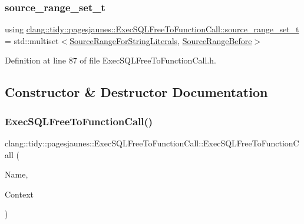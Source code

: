 \subsubsection{\texorpdfstring{source\+\_\+range\+\_\+set\+\_\+t}{source\_range\_set\_t}}
{\footnotesize\ttfamily using \hyperlink{classclang_1_1tidy_1_1pagesjaunes_1_1_exec_s_q_l_free_to_function_call_af0b034c76887939877049fe00944b216}{clang\+::tidy\+::pagesjaunes\+::\+Exec\+S\+Q\+L\+Free\+To\+Function\+Call\+::source\+\_\+range\+\_\+set\+\_\+t} =  std\+::multiset$<$\hyperlink{classclang_1_1tidy_1_1pagesjaunes_1_1_exec_s_q_l_free_to_function_call_1_1_source_range_for_string_literals}{Source\+Range\+For\+String\+Literals}, \hyperlink{classclang_1_1tidy_1_1pagesjaunes_1_1_exec_s_q_l_free_to_function_call_1_1_source_range_before}{Source\+Range\+Before}$>$}



Definition at line 87 of file Exec\+S\+Q\+L\+Free\+To\+Function\+Call.\+h.



\subsection{Constructor \& Destructor Documentation}
\mbox{\label{classclang_1_1tidy_1_1pagesjaunes_1_1_exec_s_q_l_free_to_function_call_a389597efb3707e3478b53bdfdbb35a97}} 
\subsubsection{\texorpdfstring{Exec\+S\+Q\+L\+Free\+To\+Function\+Call()}{ExecSQLFreeToFunctionCall()}}
{\footnotesize\ttfamily clang\+::tidy\+::pagesjaunes\+::\+Exec\+S\+Q\+L\+Free\+To\+Function\+Call\+::\+Exec\+S\+Q\+L\+Free\+To\+Function\+Call (\begin{DoxyParamCaption}\item[{String\+Ref}]{Name,  }\item[{Clang\+Tidy\+Context $\ast$}]{Context }\end{DoxyParamCaption})}



